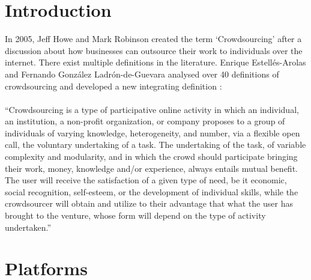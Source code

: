 \section{Introduction}
In 2005, Jeff Howe and Mark Robinson created the term `Crowdsourcing' after a discussion about how businesses can outsource their work to individuals over the internet. There exist multiple definitions in the literature. Enrique Estell\'{e}s-Arolas and Fernando Gonz\'{a}lez Ladr\'{o}n-de-Guevara analysed over 40 definitions of crowdsourcing and developed a new integrating definition \cite{estelles}:\\\\
``Crowdsourcing is a type of participative online activity in which an individual, an institution, a non-profit organization, or company proposes to a group of individuals of varying knowledge, heterogeneity, and number, via a flexible open call, the voluntary undertaking of a task. The undertaking of the task, of variable complexity and modularity, and in which the crowd should participate bringing their work, money, knowledge and/or experience, always entails mutual benefit. The user will receive the satisfaction of a given type of need, be it economic, social recognition, self-esteem, or the development of individual skills, while the crowdsourcer will obtain and utilize to their advantage that what the user has brought to the venture, whose form will depend on the type of activity undertaken.''
\section{Platforms}
